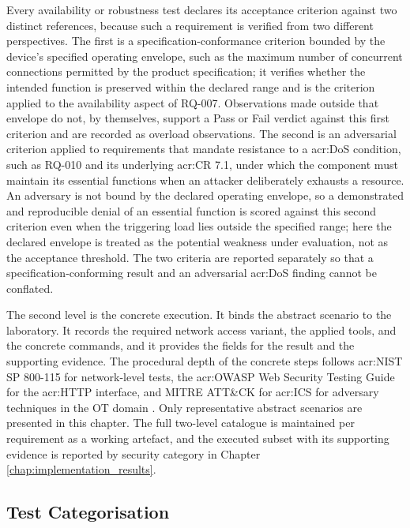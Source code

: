 Every availability or robustness test declares its acceptance criterion against two distinct references, because such a requirement is verified from two different perspectives. The first is a specification-conformance criterion bounded by the device's specified operating envelope, such as the maximum number of concurrent connections permitted by the product specification; it verifies whether the intended function is preserved within the declared range and is the criterion applied to the availability aspect of RQ-007. Observations made outside that envelope do not, by themselves, support a Pass or Fail verdict against this first criterion and are recorded as overload observations. The second is an adversarial criterion applied to requirements that mandate resistance to a \gls{acr:DoS} condition, such as RQ-010 and its underlying \gls{acr:CR} 7.1, under which the component must maintain its essential functions when an attacker deliberately exhausts a resource. An adversary is not bound by the declared operating envelope, so a demonstrated and reproducible denial of an essential function is scored against this second criterion even when the triggering load lies outside the specified range; here the declared envelope is treated as the potential weakness under evaluation, not as the acceptance threshold. The two criteria are reported separately so that a specification-conforming result and an adversarial \gls{acr:DoS} finding cannot be conflated. 

The second level is the concrete execution. It binds the abstract scenario to the laboratory. It records the required network access variant, the applied tools, and the concrete commands, and it provides the fields for the result and the supporting evidence. The procedural depth of the concrete steps follows \gls{acr:NIST} SP 800-115 for network-level tests, the \gls{acr:OWASP} Web Security Testing Guide for the \gls{acr:HTTP} interface, and MITRE ATT\&CK for \gls{acr:ICS} for adversary techniques in the OT domain \cite[p. 1-1]{nist_sp800_115} \cite{manana2026pentest} \cite{mitre_attack_ics}. Only representative abstract scenarios are presented in this chapter. The full two-level catalogue is maintained per requirement as a working artefact, and the executed subset with its supporting evidence is reported by security category in Chapter \ref{chap:implementation_results}. 

\subsection{Test Categorisation} 
\label{subsec:test_categorisation} 

